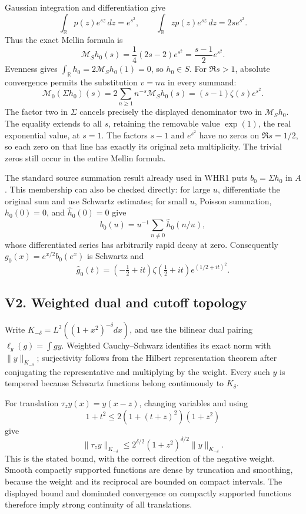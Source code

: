 Gaussian integration and differentiation give \[
\int_{\mathbb R}p(z)e^{sz}\,dz=e^{s^2},\qquad
\int_{\mathbb R}zp(z)e^{sz}\,dz=2s e^{s^2}.
\] Thus the exact Mellin formula is \[
\mathcal M_S h_0(s)=\frac14(2s-2)e^{s^2}
=\frac{s-1}{2}e^{s^2}.
\] Evenness gives \(\int_{\mathbb R}h_0=2\mathcal M_Sh_0(1)=0\), so
\(h_0\in S\). For \(\Re s>1\), absolute convergence permits the
substitution \(v=nu\) in every summand: \[
\mathcal M_0(\Sigma h_0)(s)
=2\sum_{n\ge1}n^{-s}\mathcal M_Sh_0(s)
=(s-1)\zeta(s)e^{s^2}.
\] The factor two in \(\Sigma\) cancels precisely the displayed
denominator two in \(\mathcal M_Sh_0\). The equality extends to all
\(s\), retaining the removable value \(\exp(1)\), the real exponential
value, at \(s=1\). The factors \(s-1\) and \(e^{s^2}\) have no zeros on
\(\Re s=1/2\), so each zero on that line has exactly its original zeta
multiplicity. The trivial zeros still occur in the entire Mellin
formula.

The standard source summation result already used in WHR1 puts
\(b_0=\Sigma h_0\) in \(A\). This membership can also be checked
directly: for large \(u\), differentiate the original sum and use
Schwartz estimates; for small \(u\), Poisson summation, \(h_0(0)=0\),
and \(\widehat h_0(0)=0\) give \[
b_0(u)=u^{-1}\sum_{n\ne0}\widehat h_0(n/u),
\] whose differentiated series has arbitrarily rapid decay at zero.
Consequently \(g_0(x)=e^{x/2}b_0(e^x)\) is Schwartz and \[
\widehat g_0(t)=(-\tfrac12+it)\zeta(\tfrac12+it)e^{(1/2+it)^2}.
\]

\subsection{V2. Weighted dual and cutoff
topology}\label{v2.-weighted-dual-and-cutoff-topology}

Write \(K_{-\delta}=L^2((1+x^2)^{-\delta}dx)\), and use the bilinear
dual pairing \(\ell_y(g)=\int gy\). Weighted Cauchy--Schwarz identifies
its exact norm with \(\|y\|_{K_{-\delta}}\); surjectivity follows from
the Hilbert representation theorem after conjugating the representative
and multiplying by the weight. Every such \(y\) is tempered because
Schwartz functions belong continuously to \(K_\delta\).

For translation \(\tau_z y(x)=y(x-z)\), changing variables and using \[
1+t^2\leq2(1+(t+z)^2)(1+z^2)
\] give \[
\|\tau_z y\|_{K_{-\delta}}
\leq2^{\delta/2}(1+z^2)^{\delta/2}\|y\|_{K_{-\delta}}.
\] This is the stated bound, with the correct direction of the negative
weight. Smooth compactly supported functions are dense by truncation and
smoothing, because the weight and its reciprocal are bounded on compact
intervals. The displayed bound and dominated convergence on compactly
supported functions therefore imply strong continuity of all
translations.

